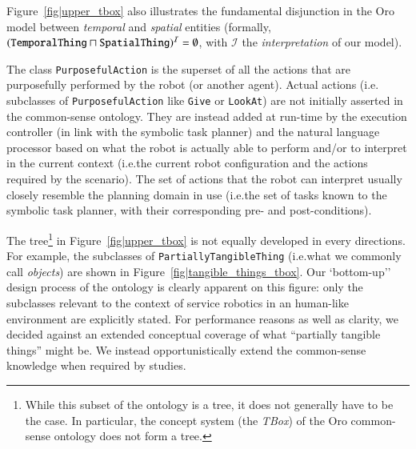 \documentclass[preprint,3p,times]{elsarticle}
\newcommand{\concept}[1]{{\small \texttt{#1}}}
\newcommand{\ie}{{i.e.\xspace}}
\begin{document}
Figure~\ref{fig|upper_tbox} also illustrates the fundamental disjunction
in the {\sc Oro} model between \emph{temporal} and \emph{spatial} entities (formally,
$(\text{\tt TemporalThing} \sqcap \text{\tt SpatialThing})^{\mathcal{I}} = \emptyset$, with
$\mathcal{I}$ the \emph{interpretation} of our model).

The class \concept{PurposefulAction} is the superset of all the actions that are
purposefully performed by the robot (or another agent). Actual actions (\ie
subclasses of \concept{PurposefulAction} like \concept{Give} or
\concept{LookAt}) are not initially asserted in the common-sense ontology. They
are instead added at run-time by the execution controller (in link with the
symbolic task planner) and the natural language processor based on what the
robot is actually able to perform and/or to interpret in the current context
(\ie the current robot configuration and the actions required by the scenario).
The set of actions that the robot can interpret usually closely resemble the
planning domain in use (\ie the set of tasks known to the symbolic task planner,
with their corresponding pre- and post-conditions).

The tree\footnote{While this subset of the ontology is a tree, it does not
generally have to be the case. In particular, the concept system (the
\emph{TBox}) of the {\sc Oro} common-sense ontology does not form a tree.} in
Figure~\ref{fig|upper_tbox} is not equally developed in every directions. For
example, the subclasses of \concept{PartiallyTangibleThing} (\ie what we
commonly call \emph{objects}) are shown in
Figure~\ref{fig|tangible_things_tbox}. Our `bottom-up'' design process of the
ontology is clearly apparent on this figure: only the subclasses relevant to the
context of service robotics in an human-like environment are explicitly stated.
For performance reasons as well as clarity, we decided against an extended
conceptual coverage of what ``partially tangible things'' might be. We instead
opportunistically extend the common-sense knowledge when required by studies.
\end{document}
